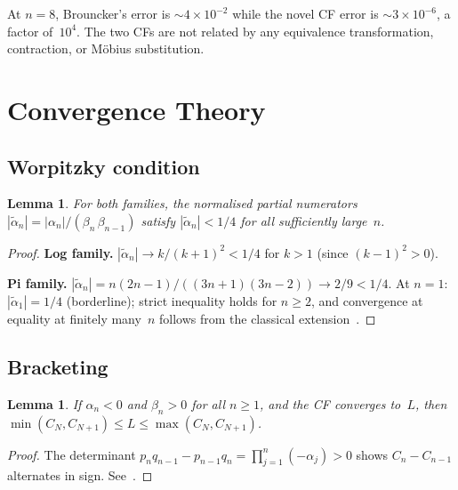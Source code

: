 \documentclass[11pt,a4paper]{article}
\theoremstyle{plain}
\newtheorem{lemma}[theorem]{Lemma}
\theoremstyle{definition}
\theoremstyle{remark}
\begin{document}
\noindent
At $n = 8$, Brouncker's error is $\sim\!4\times 10^{-2}$ while the
novel CF error is $\sim\!3\times 10^{-6}$, a factor of~$10^4$.
The two CFs are not related by any equivalence transformation,
contraction, or M\"obius substitution.

\section{Convergence Theory}\label{sec:conv}

\subsection{Worpitzky condition}

\begin{lemma}\label{lem:worpitzky}
For both families, the normalised partial numerators
$|\tilde\alpha_n| = |\alpha_n|/(\beta_n\,\beta_{n-1})$ satisfy
$|\tilde\alpha_n| < 1/4$ for all sufficiently large~$n$.
\end{lemma}

\begin{proof}
\textbf{Log family.}
$|\tilde\alpha_n| \to k/(k{+}1)^2 < 1/4$ for $k > 1$
(since $(k{-}1)^2 > 0$).

\textbf{Pi family.}
$|\tilde\alpha_n| = n(2n{-}1)/((3n{+}1)(3n{-}2)) \to 2/9 < 1/4$.
At $n = 1$: $|\tilde\alpha_1| = 1/4$ (borderline);
strict inequality holds for $n \ge 2$, and convergence at
equality at finitely many~$n$ follows from the classical
extension~\cite[\S4.2]{lorentzen2008}.
\end{proof}

\subsection{Bracketing}

\begin{lemma}\label{lem:bracket}
If $\alpha_n < 0$ and $\beta_n > 0$ for all $n \ge 1$, and the CF
converges to~$L$, then
$\min(C_N,C_{N+1}) \le L \le \max(C_N,C_{N+1})$.
\end{lemma}

\begin{proof}
The determinant $p_n q_{n-1} - p_{n-1} q_n
= \prod_{j=1}^n (-\alpha_j) > 0$
shows $C_n - C_{n-1}$ alternates in sign.
See~\cite[Theorem~4.35]{lorentzen2008}.
\end{proof}
\end{document}

